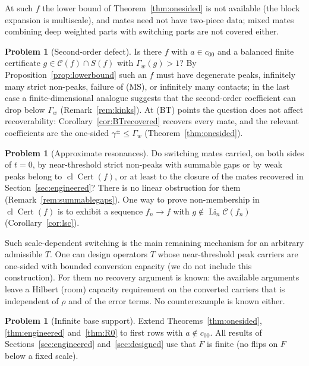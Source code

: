 \documentclass[10pt]{amsart}
\theoremstyle{definition}
\newtheorem{problem}[theorem]{Problem}
\theoremstyle{remark}
\newcommand{\Cset}{\mathcal C}
\newcommand{\Cert}{\operatorname{Cert}}
\newcommand{\Li}{\operatorname*{Li}}
\newcommand{\cl}{\operatorname{cl}}
\begin{document}
At such $f$ the lower bound of Theorem~\ref{thm:onesided} is not available
(the block expansion is multiscale), and mates need not have two-piece data;
mixed mates combining deep weighted parts with switching parts are not
covered either.

\begin{problem}[Second-order defect]\label{prob:secondorder}
Is there $f$ with $a\in c_{00}$ and a balanced finite certificate
$g\in\Cset(f)\cap S(f)$ with $\Gamma_w(g)>1$?  By
Proposition~\ref{prop:lowerbound} such an $f$ must have degenerate peaks,
infinitely many strict non-peaks, failure of (MS), or infinitely many
contacts; in the last case a finite-dimensional analogue suggests that the
second-order coefficient can drop below $\Gamma_w$ (Remark~\ref{rem:kinks}).
At \textup{(BT)} points the question does not affect recoverability:
Corollary~\ref{cor:BTrecovered} recovers every mate, and the relevant
coefficients are the one-sided $\gamma^\pm\le\Gamma_w$
(Theorem~\ref{thm:onesided}).
\end{problem}

\begin{problem}[Approximate resonances]\label{prob:approx}
Do switching mates carried, on both sides of $t=0$, by near-threshold
strict non-peaks with summable gaps or by weak peaks belong to
$\cl\Cert(f)$, or at least to the closure of the mates recovered in
Section~\ref{sec:engineered}?  There is no linear obstruction for them
(Remark~\ref{rem:summablegaps}).  One way to prove non-membership in
$\cl\Cert(f)$ is to exhibit a sequence $f_n\to f$ with
$g\notin\Li_n\Cset(f_n)$ (Corollary~\ref{cor:lsc}).
\end{problem}

Such scale-dependent switching is the main remaining mechanism for an
arbitrary admissible $T$.  One can design operators $T$ whose
near-threshold peak carriers are one-sided with bounded conversion capacity
(we do not include this construction).  For them no recovery argument is
known: the available arguments leave a Hilbert (room) capacity requirement
on the converted carriers that is independent of $\rho$ and of the error
terms.  No counterexample is known either.

\begin{problem}[Infinite base support]\label{prob:infiniteF}
Extend Theorems~\ref{thm:onesided}, \ref{thm:engineered} and~\ref{thm:R0}
to first rows with $a\notin c_{00}$.  All results of
Sections~\ref{sec:engineered} and~\ref{sec:designed} use that $F$ is finite
(no flips on $F$ below a fixed scale).
\end{problem}
\end{document}
